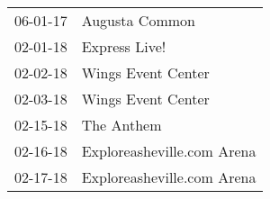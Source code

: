 \begin{supertabular}{p{0.25\columnwidth}p{0.75\columnwidth}}
 06-01-17 &              Augusta Common \\
 02-01-18 &               Express Live! \\
 02-02-18 &          Wings Event Center \\
 02-03-18 &          Wings Event Center \\
 02-15-18 &                  The Anthem \\
 02-16-18 &  Exploreasheville.com Arena \\
 02-17-18 &  Exploreasheville.com Arena \\
\end{supertabular}

